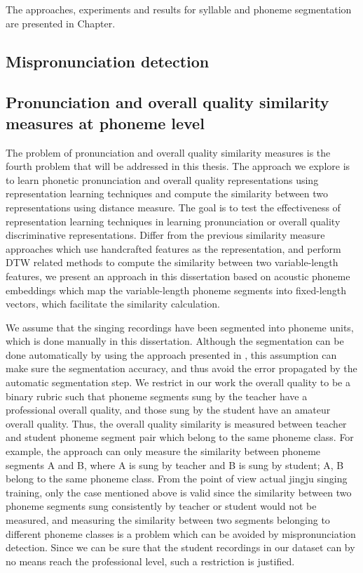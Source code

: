 The approaches, experiments and results for syllable and phoneme segmentation are presented in Chapter.

\subsection{Mispronunciation detection}\label{sec:ch3:mispronunciation}

\subsection{Pronunciation and overall quality similarity measures at phoneme level}\label{sec:ch3:similarity_formulation}

The problem of pronunciation and overall quality similarity measures is the fourth problem that will be addressed in this thesis. The approach we explore is to learn phonetic pronunciation and overall quality representations using representation learning techniques and compute the similarity between two representations using distance measure. The goal is to test the effectiveness of representation learning techniques in learning pronunciation or overall quality discriminative representations. Differ from the previous similarity measure approaches which use handcrafted features as the representation, and perform DTW related methods to compute the similarity between two variable-length features, we present an approach in this dissertation based on acoustic phoneme embeddings which map the variable-length phoneme segments into fixed-length vectors, which facilitate the similarity calculation.

We assume that the singing recordings have been segmented into phoneme units, which is done manually in this dissertation. Although the segmentation can be done automatically by using the approach presented in , this assumption can make sure the segmentation accuracy, and thus avoid the error propagated by the automatic segmentation step. We restrict in our work the overall quality to be a binary rubric such that phoneme segments sung by the teacher have a professional overall quality, and those sung by the student have an amateur overall quality. Thus, the overall quality similarity is measured between teacher and student phoneme segment pair which belong to the same phoneme class. For example, the approach can only measure the similarity between phoneme segments A and B, where A is sung by teacher and B is sung by student; A, B belong to the same phoneme class. From the point of view actual jingju singing training, only the case mentioned above is valid since the similarity between two phoneme segments sung consistently by teacher or student would not be measured, and measuring the similarity between two segments belonging to different phoneme classes is a problem which can be avoided by mispronunciation detection. Since we can be sure that the student recordings in our dataset can by no means reach the professional level, such a restriction is justified.

